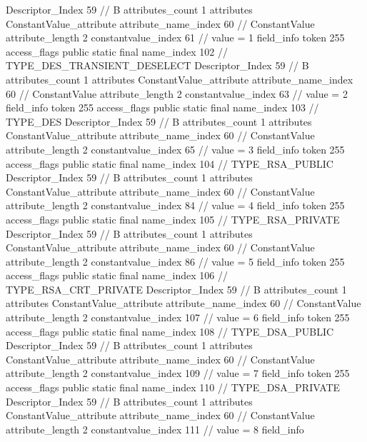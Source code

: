 {{{{{				Descriptor_Index	59		// B
				attributes_count	1
				attributes {
				ConstantValue_attribute {
					attribute_name_index	60		// ConstantValue
					attribute_length	2
					constantvalue_index	61		// value = 1
				}
				}
			}
			field_info {
				token	255
				access_flags	public static final
				name_index	102		// TYPE_DES_TRANSIENT_DESELECT
				Descriptor_Index	59		// B
				attributes_count	1
				attributes {
				ConstantValue_attribute {
					attribute_name_index	60		// ConstantValue
					attribute_length	2
					constantvalue_index	63		// value = 2
				}
				}
			}
			field_info {
				token	255
				access_flags	public static final
				name_index	103		// TYPE_DES
				Descriptor_Index	59		// B
				attributes_count	1
				attributes {
				ConstantValue_attribute {
					attribute_name_index	60		// ConstantValue
					attribute_length	2
					constantvalue_index	65		// value = 3
				}
				}
			}
			field_info {
				token	255
				access_flags	public static final
				name_index	104		// TYPE_RSA_PUBLIC
				Descriptor_Index	59		// B
				attributes_count	1
				attributes {
				ConstantValue_attribute {
					attribute_name_index	60		// ConstantValue
					attribute_length	2
					constantvalue_index	84		// value = 4
				}
				}
			}
			field_info {
				token	255
				access_flags	public static final
				name_index	105		// TYPE_RSA_PRIVATE
				Descriptor_Index	59		// B
				attributes_count	1
				attributes {
				ConstantValue_attribute {
					attribute_name_index	60		// ConstantValue
					attribute_length	2
					constantvalue_index	86		// value = 5
				}
				}
			}
			field_info {
				token	255
				access_flags	public static final
				name_index	106		// TYPE_RSA_CRT_PRIVATE
				Descriptor_Index	59		// B
				attributes_count	1
				attributes {
				ConstantValue_attribute {
					attribute_name_index	60		// ConstantValue
					attribute_length	2
					constantvalue_index	107		// value = 6
				}
				}
			}
			field_info {
				token	255
				access_flags	public static final
				name_index	108		// TYPE_DSA_PUBLIC
				Descriptor_Index	59		// B
				attributes_count	1
				attributes {
				ConstantValue_attribute {
					attribute_name_index	60		// ConstantValue
					attribute_length	2
					constantvalue_index	109		// value = 7
				}
				}
			}
			field_info {
				token	255
				access_flags	public static final
				name_index	110		// TYPE_DSA_PRIVATE
				Descriptor_Index	59		// B
				attributes_count	1
				attributes {
				ConstantValue_attribute {
					attribute_name_index	60		// ConstantValue
					attribute_length	2
					constantvalue_index	111		// value = 8
				}
				}
			}
			field_info {
}}}}}
